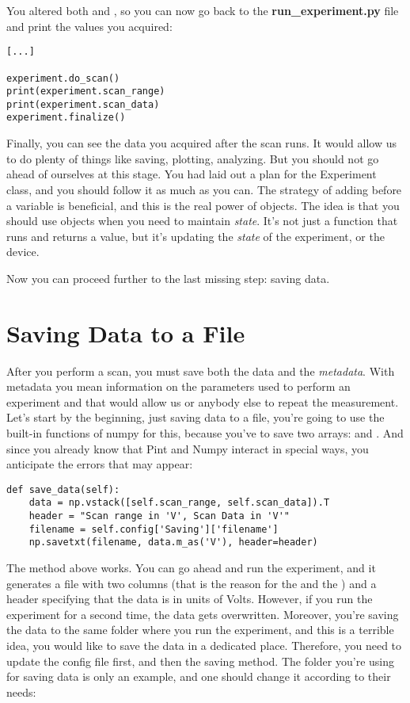 You altered both  and , so you can now go back to the \textbf{run\_experiment.py} file and print the values you acquired:

\begin{verbatim}
[...]

experiment.do_scan()
print(experiment.scan_range)
print(experiment.scan_data)
experiment.finalize()
\end{verbatim}

Finally, you can see the data you acquired after the scan runs. It would allow us to do plenty of things like saving, plotting, analyzing. But you should not go ahead of ourselves at this stage. You had laid out a plan for the Experiment class, and you should follow it as much as you can. The strategy of adding  before a variable is beneficial, and this is the real power of objects. The idea is that you should use objects when you need to maintain \emph{state}. It's not just a function that runs and returns a value, but it's updating the \emph{state} of the experiment, or the device.

Now you can proceed further to the last missing step: saving data.

\section{Saving Data to a File}\label{sec:saving-data}
After you perform a scan, you must save both the data and the \emph{metadata}. With metadata you mean information on the parameters used to perform an experiment and that would allow us or anybody else to repeat the measurement. Let's start by the beginning, just saving data to a file, you're going to use the built-in functions of numpy for this, because you've to save two arrays:  and . And since you already know that Pint and Numpy interact in special ways, you anticipate the errors that may appear:

\begin{verbatim}
def save_data(self):
    data = np.vstack([self.scan_range, self.scan_data]).T
    header = "Scan range in 'V', Scan Data in 'V'"
    filename = self.config['Saving']['filename']
    np.savetxt(filename, data.m_as('V'), header=header)
\end{verbatim}

The method above works. You can go ahead and run the experiment, and it generates a file with two columns (that is the reason for the  and the ) and a header specifying that the data is in units of Volts. However, if you run the experiment for a second time, the data gets overwritten. Moreover, you're saving the data to the same folder where you run the experiment, and this is a terrible idea, you would like to save the data in a dedicated place. Therefore, you need to update the config file first, and then the saving method. The folder you're using for saving data is only an example, and one should change it according to their needs:

